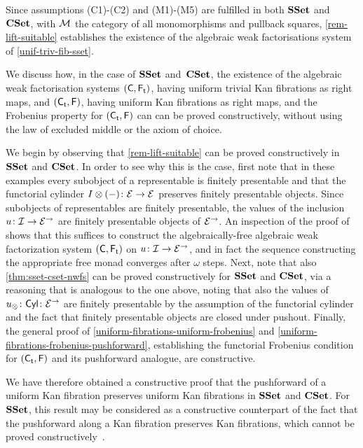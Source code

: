 \documentclass[reqno,10pt,a4paper,oneside,draft]{amsart}
\begin{document}
{{\begin{remark} \label{justify-sset-cset-examples}
Since assumptions (C1)-(C2) and (M1)-(M5) are fulfilled in both $\SSet$ and~$\CSet$, with $\cal{M}$ the category of all monomorphisms and pullback squares, \cref{rem-lift-suitable} establishes 
the existence of  the algebraic weak factorisations system  of  \cref{unif-triv-fib-sset}. 
\end{remark}


\begin{remark} \label{rem:constructive-small-object}  We discuss how, in the case of $\SSet$ and~$\CSet$, the existence of the algebraic weak factorisation systems $(\CC, \TF)$,
having uniform trivial Kan fibrations as right maps,  and $(\TC, \FF)$, having uniform Kan fibrations as right maps, and the Frobenius property for $(\TC, \FF)$  can can be proved constructively, \ie without using the law of excluded middle or the axiom of choice.

We begin by observing that \cref{rem-lift-suitable} can be proved constructively in $\SSet$ and $\CSet$. 
In order to see why this is the case, first note that in these examples every subobject of a representable is finitely presentable and that the functorial cylinder $\interval \otimes (-) \co \cal{E} \to \cal{E}$ preserves finitely presentable objects.
Since subobjects of representables are finitely presentable, the values of the inclusion $u \co \cal{I} \to \cal{E}^\to$ are finitely presentable objects of $\cal{E}^\to$.
An inspection of the proof of \cite[Theorem~4.4]{garner:small-object-argument} shows that this suffices to construct the algebraically-free algebraic weak factorization system $(\CC, \TF)$ on $u \co \cal{I} \to \cal{E}^\to$, and in fact the sequence constructing the appropriate free monad converges after $\omega$ steps. 
Next, note that also \cref{thm:sset-cset-nwfs} can be proved constructively for $\SSet$ and $\CSet$, via a reasoning that is analogous to the one above, noting that also the values of $u_\otimes \co \Cyl \co \cal{E}^\to$ are finitely presentable by the assumption of the functorial cylinder and the fact that finitely presentable objects are closed under pushout. Finally, the general proof of
\cref{uniform-fibrations-uniform-frobenius} and  \cref{uniform-fibrations-frobenius-pushforward}, establishing the functorial Frobenius condition for  $(\TC, \FF)$ and its pushforward analogue, are constructive. 

We have therefore obtained a constructive proof that the pushforward of a uniform Kan fibration preserves uniform Kan fibrations in $\SSet$ and $\CSet$. For $\SSet$,  this
result may be considered as a constructive counterpart of the fact that the pushforward along a Kan fibration preserves Kan fibrations, which cannot be proved constructively~\cite{coquand-non-constructivity-kan}. 


\end{remark}}}
\end{document}
